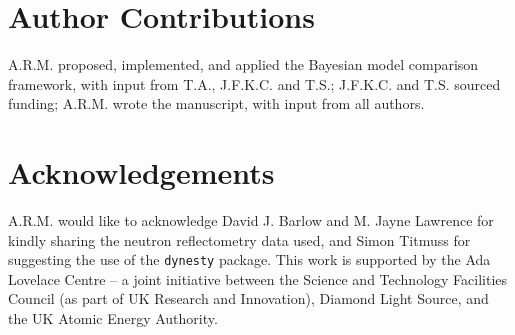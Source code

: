 \documentclass[
 reprint,
 superscriptaddress,
 amsmath,amssymb,
 aps,
]{revtex4-1}
\begin{document}
\section*{Author Contributions}

A.R.M. proposed, implemented, and applied the Bayesian model comparison framework, with input from T.A., J.F.K.C. and T.S.; J.F.K.C. and T.S. sourced funding; A.R.M. wrote the manuscript, with input from all authors.

\section*{Acknowledgements}

A.R.M. would like to acknowledge David J. Barlow and M. Jayne Lawrence for kindly sharing the neutron reflectometry data used, and Simon Titmuss for suggesting the use of the \texttt{dynesty} package.
This work is supported by the Ada Lovelace Centre – a joint initiative between the Science and Technology Facilities Council (as part of UK Research and Innovation), Diamond Light Source, and the UK Atomic Energy Authority.



\end{document}

